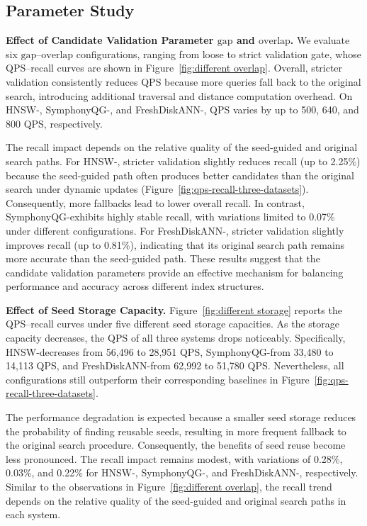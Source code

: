 \subsection{Parameter Study}

\noindent \textbf{Effect of Candidate Validation Parameter $\mathrm{gap}$ and $\mathrm{overlap}$.}  We evaluate six $\mathrm{gap}$--$\mathrm{overlap}$ configurations, ranging from loose to strict validation gate, whose QPS--recall curves are shown in Figure~\ref{fig:different overlap}. Overall, stricter validation consistently reduces QPS because more queries fall back to the original search, introducing additional traversal and distance computation overhead. On HNSW-\system, SymphonyQG-\system, and FreshDiskANN-\system, QPS varies by up to 500, 640, and 800 QPS, respectively.

The recall impact depends on the relative quality of the seed-guided and original search paths. For HNSW-\system, stricter validation slightly reduces recall (up to 2.25\%) because the seed-guided path often produces better candidates than the original search under dynamic updates (Figure~\ref{fig:qps-recall-three-datasets}). Consequently, more fallbacks lead to lower overall recall. In contrast, SymphonyQG-\system exhibits highly stable recall, with variations limited to 0.07\% under different configurations. For FreshDiskANN-\system, stricter validation slightly improves recall (up to 0.81\%), indicating that its original search path remains more accurate than the seed-guided path. These results suggest that the candidate validation parameters provide an effective mechanism for balancing performance and accuracy across different index structures.

\noindent \textbf{Effect of Seed Storage Capacity.} Figure~\ref{fig:different storage} reports the QPS--recall curves under five different seed storage capacities. As the storage capacity decreases, the QPS of all three systems drops noticeably. Specifically, HNSW-\system decreases from 56,496 to 28,951 QPS, SymphonyQG-\system from 33,480 to 14,113 QPS, and FreshDiskANN-\system from 62,992 to 51,780 QPS. Nevertheless, all configurations still outperform their corresponding baselines in Figure~\ref{fig:qps-recall-three-datasets}.

The performance degradation is expected because a smaller seed storage reduces the probability of finding reusable seeds, resulting in more frequent fallback to the original search procedure. Consequently, the benefits of seed reuse become less pronounced. The recall impact remains modest, with variations of 0.28\%, 0.03\%, and 0.22\% for HNSW-\system, SymphonyQG-\system, and FreshDiskANN-\system, respectively. Similar to the observations in Figure~\ref{fig:different overlap}, the recall trend depends on the relative quality of the seed-guided and original search paths in each system.


